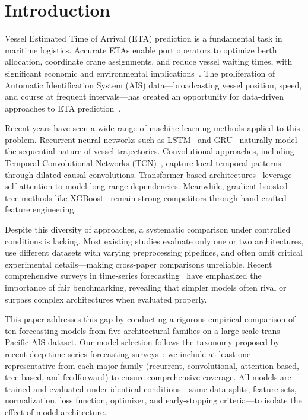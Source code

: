 \documentclass[conference]{IEEEtran}
\begin{document}
\section{Introduction}

Vessel Estimated Time of Arrival (ETA) prediction is a fundamental task in maritime logistics.
Accurate ETAs enable port operators to optimize berth allocation, coordinate crane assignments, and reduce vessel waiting times, with significant economic and environmental implications~\cite{unctad2023}.
The proliferation of Automatic Identification System (AIS) data---broadcasting vessel position, speed, and course at frequent intervals---has created an opportunity for data-driven approaches to ETA prediction~\cite{fang2022}.

Recent years have seen a wide range of machine learning methods applied to this problem.
Recurrent neural networks such as LSTM~\cite{zhang2022lstm} and GRU~\cite{han2021gru} naturally model the sequential nature of vessel trajectories.
Convolutional approaches, including Temporal Convolutional Networks (TCN)~\cite{bai2018tcn}, capture local temporal patterns through dilated causal convolutions.
Transformer-based architectures~\cite{dong2023transformer, zhou2021informer} leverage self-attention to model long-range dependencies.
Meanwhile, gradient-boosted tree methods like XGBoost~\cite{chen2016xgboost} remain strong competitors through hand-crafted feature engineering.

Despite this diversity of approaches, a systematic comparison under controlled conditions is lacking.
Most existing studies evaluate only one or two architectures, use different datasets with varying preprocessing pipelines, and often omit critical experimental details---making cross-paper comparisons unreliable.
Recent comprehensive surveys in time-series forecasting~\cite{kim2025comprehensive, zeng2023transformers} have emphasized the importance of fair benchmarking, revealing that simpler models often rival or surpass complex architectures when evaluated properly.

This paper addresses this gap by conducting a rigorous empirical comparison of ten forecasting models from five architectural families on a large-scale trans-Pacific AIS dataset.
Our model selection follows the taxonomy proposed by recent deep time-series forecasting surveys~\cite{kim2025comprehensive}: we include at least one representative from each major family (recurrent, convolutional, attention-based, tree-based, and feedforward) to ensure comprehensive coverage.
All models are trained and evaluated under identical conditions---same data splits, feature sets, normalization, loss function, optimizer, and early-stopping criteria---to isolate the effect of model architecture.
\end{document}

